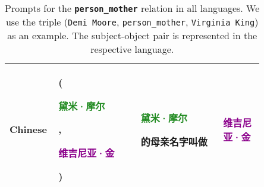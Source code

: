 \begin{table*}[htbp]
\begin{center}
\begin{tabular}{m{0.10\linewidth} p{0.30\linewidth} p{0.30\linewidth} m{0.15\linewidth}}
\midrule
{\centering Chinese} 
    & {\raggedright (\textcolor{forestgreen}{\begin{CJK}{UTF8}{gbsn}黛米·摩尔\end{CJK}}, \textcolor{darkmagenta}{\begin{CJK}{UTF8}{gbsn}维吉尼亚·金\end{CJK}})}
    & \textcolor{forestgreen}{\begin{CJK}{UTF8}{gbsn}黛米·摩尔\end{CJK}}\begin{CJK}{UTF8}{gbsn}的母亲名字叫做\end{CJK}
    & {\centering \textcolor{darkmagenta}{\begin{CJK}{UTF8}{gbsn}维吉尼亚·金\end{CJK}}} \\
\bottomrule
\end{tabular}
\end{center}
\caption{Prompts for the \textbf{\texttt{person\_mother}} relation in all languages. We use the triple (\texttt{Demi Moore}, \texttt{person\_mother}, \texttt{Virginia King}) as an example. The subject-object pair is represented in the respective language.}
\label{tab:prompts_person_mother}
\end{table*}

